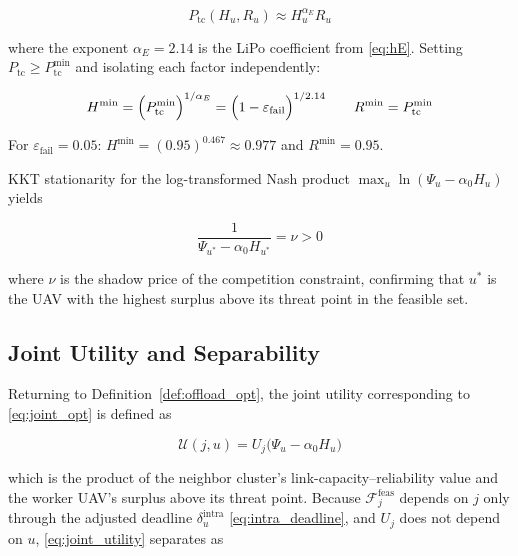 \documentclass[journal]{IEEEtran}
\begin{document}
\begin{IEEEproof}
\begin{equation}\label{eq:ptc}
  P_{\mathrm{tc}}(H_{u},R_{u})
  \approx H_{u}^{\alpha_{E}} R_{u}
\end{equation}

where the exponent $\alpha_{E}=2.14$ is the LiPo
coefficient from \eqref{eq:hE}.  Setting
$P_{\mathrm{tc}}\geq P_{\mathrm{tc}}^{\min}$ and
isolating each factor independently:

\begin{equation}\label{eq:Hmin}
  H^{\min}
  =\Bigl(P_{\mathrm{tc}}^{\min}\Bigr)^{1/\alpha_{E}}
  =\Bigl(1-\varepsilon_{\mathrm{fail}}\Bigr)^{1/2.14}
  \qquad
  R^{\min}=P_{\mathrm{tc}}^{\min}
\end{equation}

For $\varepsilon_{\mathrm{fail}}=0.05$:
$H^{\min}=(0.95)^{0.467}\approx0.977$ and $R^{\min}=0.95$.

KKT stationarity for the log-transformed Nash product
$\max_{u}\ln(\Psi_{u}-\alpha_{0}H_{u})$ yields

\begin{equation}\label{eq:kkt_worker}
  \frac{1}{\Psi_{u^{*}}-\alpha_{0}H_{u^{*}}}=\nu>0
\end{equation}

where $\nu$ is the shadow price of the competition
constraint, confirming that $u^{*}$ is the UAV with the
highest surplus above its threat point in the feasible
set.

\subsection{Joint Utility and Separability}\label{sec:joint}

Returning to Definition~\ref{def:offload_opt}, the joint
utility corresponding to \eqref{eq:joint_opt} is defined as

\begin{equation}\label{eq:joint_utility}
  \mathcal{U}(j,u)
  =U_{j}\bigl(\Psi_{u}-\alpha_{0}H_{u}\bigr)
\end{equation}

which is the product of the neighbor cluster's
link-capacity--reliability value and the worker UAV's
surplus above its threat point.  Because
$\mathcal{F}_{j}^{\mathrm{feas}}$ depends on $j$ only
through the adjusted deadline $\delta_{u}^{\mathrm{intra}}$
\eqref{eq:intra_deadline}, and $U_{j}$ does not depend on
$u$, \eqref{eq:joint_utility} separates as


\end{IEEEproof}
\end{document}
